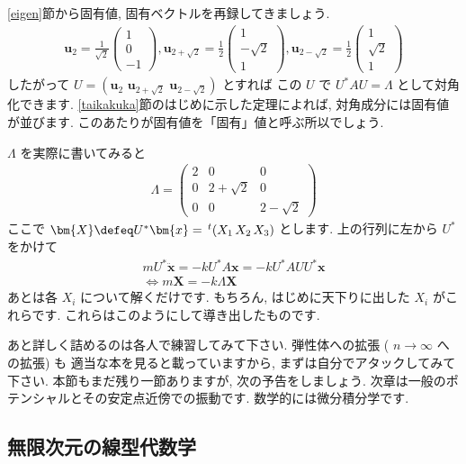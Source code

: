 \documentclass[openany, a4paper, oneside]{jsbook}
\begin{document}
\ref{eigen}節から固有値, 固有ベクトルを再録してきましょう.
\begin{align}
    \bm{u}_{2}
    =
    \frac{1}{\sqrt{2}} \begin{pmatrix} 1 \\ 0 \\ -1 \end{pmatrix} ,
    \bm{u}_{2 + \sqrt{2}}
    =
    \frac{1}{2} \begin{pmatrix} 1 \\ -\sqrt{2} \\ 1 \end{pmatrix} ,
    \bm{u}_{2 - \sqrt{2}}
    =
    \frac{1}{2} \begin{pmatrix} 1 \\ \sqrt{2} \\ 1 \end{pmatrix}
\end{align}
したがって $U = (\bm{u}_2 \,\, \bm{u}_{2+\sqrt{2}} \,\, \bm{u}_{2-\sqrt{2}})$ とすれば
この $U$ で $U^{*}AU=\Lambda$ として対角化できます. \ref{taikakuka}節のはじめに示した定理によれば,
対角成分には固有値が並びます. このあたりが固有値を「固有」値と呼ぶ所以でしょう.

$\Lambda$ を実際に書いてみると
\begin{align}
    \Lambda = \begin{pmatrix} 2 & 0 & 0 \\
                              0 & 2 + \sqrt{2} & 0 \\
                              0 & 0 & 2 - \sqrt{2}
              \end{pmatrix}
\end{align}
ここで $\bm{X}\defeq U^{*}\bm{x}=\, ^{t} (X_1 \, X_2 \, X_3)$ とします. 上の行列に左から $U^{*}$ をかけて
\begin{gather}
    m U^{*}\ddot{\bm{x}} = -k U^{*}A\bm{x} = -k U^{*}AUU^{*}\bm{x} \\
    \Longleftrightarrow
    m\bm{X} = -k \Lambda \bm{X}
\end{gather}
あとは各 $X_i$ について解くだけです. もちろん, はじめに天下りに出した $X_i$ がこれらです.
これらはこのようにして導き出したものです.

あと詳しく詰めるのは各人で練習してみて下さい. 弾性体への拡張 ( $n \rightarrow \infty$ への拡張) も
適当な本を見ると載っていますから, まずは自分でアタックしてみて下さい.
本節もまだ残り一節ありますが, 次の予告をしましょう.
次章は一般のポテンシャルとその安定点近傍での振動です. 数学的には微分積分学です.
\subsection{無限次元の線型代数学}
\end{document}
